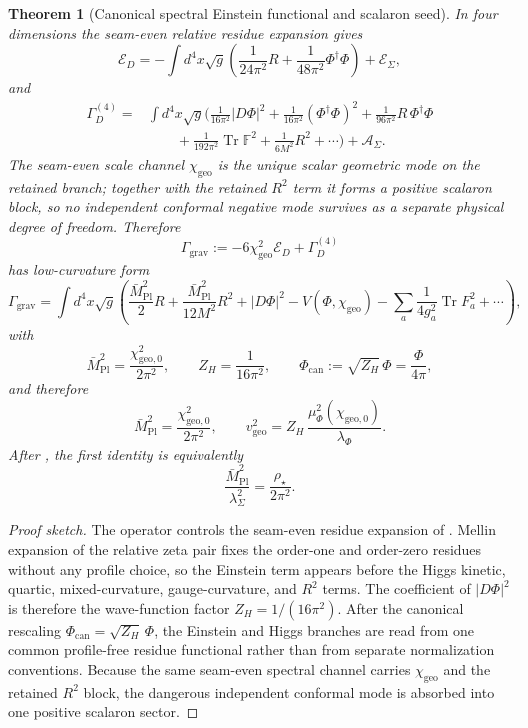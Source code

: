 \documentclass[11pt,a4paper]{article}
\newtheorem{theorem}{Theorem}[section]
\theoremstyle{definition}
\theoremstyle{remark}
\DeclareMathOperator{\tr}{Tr}
\newcommand{\Mpl}{\bar M_{\mathrm{Pl}}}
\newcommand{\chigeo}{\chi_{\mathrm{geo}}}
\newcommand{\chigeozero}{\chi_{\mathrm{geo},0}}
\newcommand{\vgeo}{v_{\mathrm{geo}}}
\begin{document}
\begin{theorem}[Canonical spectral Einstein functional and scalaron seed]
\label{prop:canonical-bosonic-normalization}
\label{thm:canonical-einstein-residue}
In four dimensions the seam-even relative residue expansion gives
\[
\mathcal E_D
=
-\int d^4x\sqrt g
\left(
\frac{1}{24\pi^2}R
+
\frac{1}{48\pi^2}\Phi^\dagger\Phi
\right)
+
\mathcal E_\Sigma,
\]
and
\[
\begin{aligned}
\Gamma_D^{(4)}
={}&
\int d^4x\sqrt g
\Big(
\frac{1}{16\pi^2}|D\Phi|^2
+\frac{1}{16\pi^2}(\Phi^\dagger\Phi)^2
+\frac{1}{96\pi^2}R\,\Phi^\dagger\Phi
\\
&\qquad
+\frac{1}{192\pi^2}\tr\mathbb F^2
+\frac{1}{6M^2}R^2
+\cdots
\Big)
+\mathcal A_\Sigma.
\end{aligned}
\]
The seam-even scale channel $\chigeo$ is the unique scalar geometric mode on the retained branch;
together with the retained $R^2$ term it forms a positive scalaron block, so no independent
conformal negative mode survives as a separate physical degree of freedom.
Therefore
\[
\Gamma_{\mathrm{grav}}
:=
-6\chigeo^2\mathcal E_D+\Gamma_D^{(4)}
\]
has low-curvature form
\[
\Gamma_{\mathrm{grav}}
=
\int d^4x\sqrt g
\left(
\frac{\Mpl^2}{2}R
+
\frac{\Mpl^2}{12M^2}R^2
+
|D\Phi|^2
-V(\Phi,\chigeo)
-\sum_a \frac{1}{4g_a^2}\tr F_a^2
+\cdots
\right),
\]
with
\[
\Mpl^2=\frac{\chigeozero^2}{2\pi^2},
\qquad
Z_H=\frac{1}{16\pi^2},
\qquad
\Phi_{\mathrm{can}}:=\sqrt{Z_H}\,\Phi=\frac{\Phi}{4\pi},
\]
and therefore
\begin{equation}
\label{eq:induced-einstein}
\Mpl^2=\frac{\chigeozero^2}{2\pi^2},
\qquad
\vgeo^2=Z_H\,\frac{\mu_\Phi^2(\chigeozero)}{\lambda_\Phi}.
\end{equation}
After , the first identity is equivalently
\[
\frac{\Mpl^2}{\lambda_\Sigma^2}=\frac{\rho_\star}{2\pi^2}.
\]
\end{theorem}

\begin{proof}[Proof sketch]
The operator  controls the seam-even residue expansion of
. Mellin expansion of the relative zeta pair fixes the order-one and
order-zero residues without any profile choice, so the Einstein term appears before the Higgs
kinetic, quartic, mixed-curvature, gauge-curvature, and $R^2$ terms. The coefficient of
$|D\Phi|^2$ is therefore the wave-function factor $Z_H=1/(16\pi^2)$. After the canonical rescaling
$\Phi_{\mathrm{can}}=\sqrt{Z_H}\,\Phi$, the Einstein and Higgs branches are read from one common
profile-free residue functional rather than from separate normalization conventions. Because the
same seam-even spectral channel carries $\chigeo$ and the retained $R^2$ block, the dangerous
independent conformal mode is absorbed into one positive scalaron sector.
\end{proof}
\end{document}
